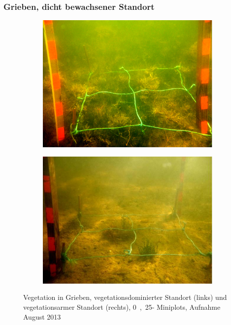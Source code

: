 \subsubsection{Grieben, dicht bewachsener Standort}


\begin{figure}[!htb]
        \centering
        \begin{subfigure}[htb]{0.45\textwidth}
                \includegraphics[width=\textwidth]{images/plotpictures/Bsp_G+M}
        \end{subfigure}
        \begin{subfigure}[htb]{0.45\textwidth}
                \includegraphics[width=\textwidth]{images/plotpictures/Bsp_G-M}
        \end{subfigure}
        \caption[Fotoaufnahmen der Vegetation in Grieben]{Vegetation in Grieben, vegetationsdominierter 						Standort (links) und  vegetationsarmer Standort (rechts), \unit{0,25}{\metre\squared}- 							Miniplots, Aufnahme August 2013}
        \label{fig:fotos_grieben}
\end{figure}

